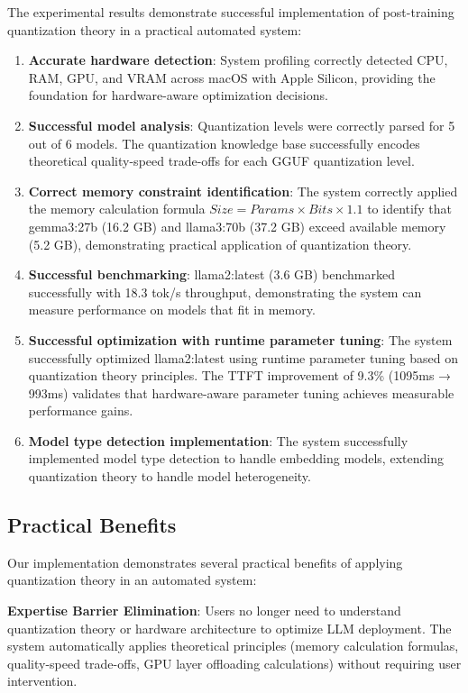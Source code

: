 \documentclass[journal]{IEEEtran}
\begin{document}
The experimental results demonstrate successful implementation of post-training quantization theory in a practical automated system:

\begin{enumerate}
    \item \textbf{Accurate hardware detection}: System profiling correctly detected CPU, RAM, GPU, and VRAM across macOS with Apple Silicon, providing the foundation for hardware-aware optimization decisions.
    \item \textbf{Successful model analysis}: Quantization levels were correctly parsed for 5 out of 6 models. The quantization knowledge base successfully encodes theoretical quality-speed trade-offs for each GGUF quantization level.
    \item \textbf{Correct memory constraint identification}: The system correctly applied the memory calculation formula $Size = Params \times Bits \times 1.1$ to identify that gemma3:27b (16.2 GB) and llama3:70b (37.2 GB) exceed available memory (5.2 GB), demonstrating practical application of quantization theory.
    \item \textbf{Successful benchmarking}: llama2:latest (3.6 GB) benchmarked successfully with 18.3 tok/s throughput, demonstrating the system can measure performance on models that fit in memory.
    \item \textbf{Successful optimization with runtime parameter tuning}: The system successfully optimized llama2:latest using runtime parameter tuning based on quantization theory principles. The TTFT improvement of 9.3\% (1095ms → 993ms) validates that hardware-aware parameter tuning achieves measurable performance gains.
    \item \textbf{Model type detection implementation}: The system successfully implemented model type detection to handle embedding models, extending quantization theory to handle model heterogeneity.
\end{enumerate}

\subsection{Practical Benefits}

Our implementation demonstrates several practical benefits of applying quantization theory in an automated system:

\textbf{Expertise Barrier Elimination}: Users no longer need to understand quantization theory or hardware architecture to optimize LLM deployment. The system automatically applies theoretical principles (memory calculation formulas, quality-speed trade-offs, GPU layer offloading calculations) without requiring user intervention.
\end{document}
